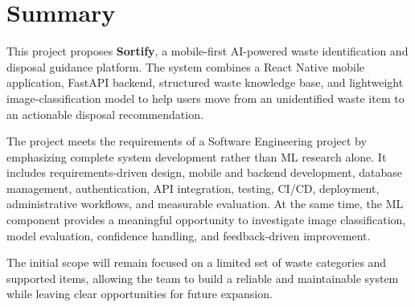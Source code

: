\documentclass[11pt,a4paper]{article}
\begin{document}
\section{Summary}

This project proposes \textbf{Sortify}, a mobile-first AI-powered waste identification and disposal guidance platform. The system combines a React Native mobile application, FastAPI backend, structured waste knowledge base, and lightweight image-classification model to help users move from an unidentified waste item to an actionable disposal recommendation.

The project meets the requirements of a Software Engineering project by emphasizing complete system development rather than ML research alone. It includes requirements-driven design, mobile and backend development, database management, authentication, API integration, testing, CI/CD, deployment, administrative workflows, and measurable evaluation. At the same time, the ML component provides a meaningful opportunity to investigate image classification, model evaluation, confidence handling, and feedback-driven improvement.

The initial scope will remain focused on a limited set of waste categories and supported items, allowing the team to build a reliable and maintainable system while leaving clear opportunities for future expansion.
\end{document}
